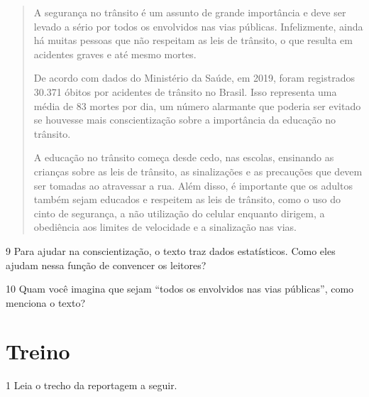 \begin{quote}
A segurança no trânsito é um assunto de grande importância e deve ser
levado a sério por todos os envolvidos nas vias públicas. Infelizmente,
ainda há muitas pessoas que não respeitam as leis de trânsito, o que
resulta em acidentes graves e até mesmo mortes.


De acordo com dados do Ministério da Saúde, em 2019, foram registrados
30.371 óbitos por acidentes de trânsito no Brasil. Isso representa uma
média de 83 mortes por dia, um número alarmante que poderia ser evitado
se houvesse mais conscientização sobre a importância da educação no
trânsito.


A educação no trânsito começa desde cedo, nas escolas, ensinando as
crianças sobre as leis de trânsito, as sinalizações e as precauções que
devem ser tomadas ao atravessar a rua. Além disso, é importante que os
adultos também sejam educados e respeitem as leis de trânsito, como o
uso do cinto de segurança, a não utilização do celular enquanto dirigem,
a obediência aos limites de velocidade e a sinalização nas vias.

\end{quote}


\num{9} Para ajudar na conscientização, o texto traz dados estatísticos. Como
eles ajudam nessa função de convencer os leitores?



\num{10} Quam você imagina que sejam ``todos os envolvidos nas vias
públicas'', como menciona o texto?


\section{Treino}

\num{1} Leia o trecho da reportagem a seguir.

